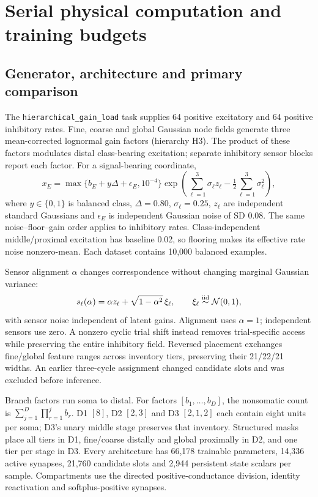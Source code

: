 \section{Serial physical computation and training budgets}
\label{note:depth}

\subsection{Generator, architecture and primary comparison}
The \texttt{hierarchical\_gain\_load} task supplies 64 positive excitatory and 64 positive inhibitory rates. Fine, coarse and global Gaussian node fields generate three mean-corrected lognormal gain factors (hierarchy H3). The product of these factors modulates distal class-bearing excitation; separate inhibitory sensor blocks report each factor. For a signal-bearing coordinate,
\begin{equation}
 x_E=\max\{b_E+y\Delta+\epsilon_E,10^{-4}\}
 \exp\!\left(\sum_{\ell=1}^{3}\sigma_\ell z_\ell-
                 \tfrac12\sum_{\ell=1}^{3}\sigma_\ell^2\right),
 \label{eq:s_task_family_nested}
\end{equation}
where $y\in\{0,1\}$ is balanced class, $\Delta=0.80$, $\sigma_\ell=0.25$, $z_\ell$ are independent standard Gaussians and $\epsilon_E$ is independent Gaussian noise of SD 0.08. The same noise--floor--gain order applies to inhibitory rates. Class-independent middle/proximal excitation has baseline 0.02, so flooring makes its effective rate noise nonzero-mean. Each dataset contains 10,000 balanced examples.

Sensor alignment $\alpha$ changes correspondence without changing marginal Gaussian variance:
\begin{equation}
 s_\ell(\alpha)=\alpha z_\ell+\sqrt{1-\alpha^2}\,\xi_\ell,
 \qquad \xi_\ell\overset{\rm iid}{\sim}\mathcal N(0,1),
 \label{eq:s_task_family_alignment}
\end{equation}
with sensor noise independent of latent gains. Alignment uses $\alpha=1$; independent sensors use zero. A nonzero cyclic trial shift instead removes trial-specific access while preserving the entire inhibitory field. Reversed placement exchanges fine/global feature ranges across inventory tiers, preserving their 21/22/21 widths. An earlier three-cycle assignment changed candidate slots and was excluded before inference.

Branch factors run soma to distal. For factors $[b_1,\ldots,b_D]$, the nonsomatic count is $\sum_{j=1}^D\prod_{r=1}^jb_r$. D1 $[8]$, D2 $[2,3]$ and D3 $[2,1,2]$ each contain eight units per soma; D3's unary middle stage preserves that inventory. Structured masks place all tiers in D1, fine/coarse distally and global proximally in D2, and one tier per stage in D3. Every architecture has 66,178 trainable parameters, 14,336 active synapses, 21,760 candidate slots and 2,944 persistent state scalars per sample. Compartments use the directed positive-conductance division, identity reactivation and softplus-positive synapses.

